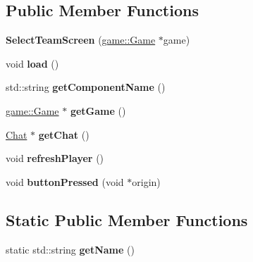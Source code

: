 \subsection*{Public Member Functions}
\begin{DoxyCompactItemize}
\item 
\hypertarget{classgraphics_1_1_select_team_screen_a52ed345d4e6d0640a860d3e4010bb054}{{\bfseries Select\-Team\-Screen} (\hyperlink{classgame_1_1_game}{game\-::\-Game} $\ast$game)}\label{classgraphics_1_1_select_team_screen_a52ed345d4e6d0640a860d3e4010bb054}

\item 
\hypertarget{classgraphics_1_1_select_team_screen_a7be372fd9e02a39dab81f9db5efb5851}{void {\bfseries load} ()}\label{classgraphics_1_1_select_team_screen_a7be372fd9e02a39dab81f9db5efb5851}

\item 
\hypertarget{classgraphics_1_1_select_team_screen_a5d9e34819df08fe6f08c1f1413c8f22c}{std\-::string {\bfseries get\-Component\-Name} ()}\label{classgraphics_1_1_select_team_screen_a5d9e34819df08fe6f08c1f1413c8f22c}

\item 
\hypertarget{classgraphics_1_1_select_team_screen_a06b1399bb5f37b5e95ecfac16f25b0a4}{\hyperlink{classgame_1_1_game}{game\-::\-Game} $\ast$ {\bfseries get\-Game} ()}\label{classgraphics_1_1_select_team_screen_a06b1399bb5f37b5e95ecfac16f25b0a4}

\item 
\hypertarget{classgraphics_1_1_select_team_screen_a3b016215e256d629d9c8d46469f8326e}{\hyperlink{classgraphics_1_1_chat}{Chat} $\ast$ {\bfseries get\-Chat} ()}\label{classgraphics_1_1_select_team_screen_a3b016215e256d629d9c8d46469f8326e}

\item 
\hypertarget{classgraphics_1_1_select_team_screen_a606a094e368de470010aebe439ae479c}{void {\bfseries refresh\-Player} ()}\label{classgraphics_1_1_select_team_screen_a606a094e368de470010aebe439ae479c}

\item 
\hypertarget{classgraphics_1_1_select_team_screen_ac7034c42a1ab248628fffc7651bf2d56}{void {\bfseries button\-Pressed} (void $\ast$origin)}\label{classgraphics_1_1_select_team_screen_ac7034c42a1ab248628fffc7651bf2d56}

\end{DoxyCompactItemize}
\subsection*{Static Public Member Functions}
\begin{DoxyCompactItemize}
\item 
\hypertarget{classgraphics_1_1_select_team_screen_a63eb1ff3f4ae201735c937b189c8ed78}{static std\-::string {\bfseries get\-Name} ()}\label{classgraphics_1_1_select_team_screen_a63eb1ff3f4ae201735c937b189c8ed78}

\end{DoxyCompactItemize}
